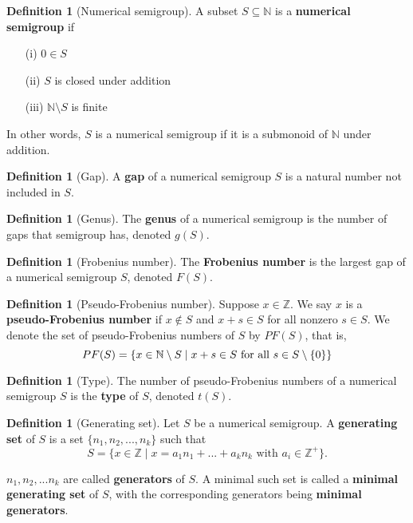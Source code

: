 \documentclass{article}
\theoremstyle{definition}
\theoremstyle{definition}
\newtheorem{defn}[thm]{Definition}
\theoremstyle{definition}
\begin{document}
\begin{defn}[Numerical semigroup]
    A subset $S \subseteq \mathbb{N}$ is a \textbf{numerical semigroup} if 

    \begin{enumerate}
        \item[(i)] $0 \in S$
        \item[(ii)] $S$ is closed under addition
        \item[(iii)] $\mathbb{N} \setminus S$ is finite
    \end{enumerate}

    In other words, $S$ is a numerical semigroup if it is a submonoid of $\mathbb{N}$ under addition.
\end{defn}

\begin{defn}[Gap]
    A \textbf{gap} of a numerical semigroup $S$ is a natural number not included in $S$. 
\end{defn}

\begin{defn}[Genus]
    The \textbf{genus} of a numerical semigroup is the number of gaps that semigroup has, denoted $g(S)$. 
\end{defn}

\begin{defn}[Frobenius number]
    The \textbf{Frobenius number} is the largest gap of a numerical semigroup $S$, denoted $F(S)$.
\end{defn}

\begin{defn}[Pseudo-Frobenius number]
     Suppose $x\in \mathbb{Z}$. We say $x$ is a \textbf{pseudo-Frobenius number} if $x\notin S$ and $x+s\in S$ for all nonzero $s\in S$. We denote the set of pseudo-Frobenius numbers of $S$ by $PF(S)$, that is, 
     $$PF(S) = \{x\in \mathbb{N} \setminus S \mid x+s\in S \space \text{ for all } s\in S\setminus{\{0\}} \}$$
\end{defn}

\begin{defn}[Type]
    The number of pseudo-Frobenius numbers of a numerical semigroup $S$ is the \textbf{type} of $S$, denoted $t(S)$. 
\end{defn}

\begin{defn}[Generating set]
    Let $S$ be a numerical semigroup. A \textbf{generating set} of $S$ is a set $\{n_1, n_2, ..., n_k\}$ such that $$S=\{x\in \mathbb{Z} \mid x = a_{1}n_{1}+ ... + a_{k}n_{k} \text{ with } a_{i}\in \mathbb{Z}^+\}.$$

    $n_1, n_2, ... n_k$ are called \textbf{generators} of $S$. A minimal such set is called a \textbf{minimal generating set} of $S$, with the corresponding generators being \textbf{minimal generators}.
\end{defn}
\end{document}
